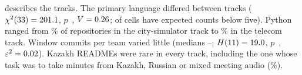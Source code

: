 \documentclass{article}
\begin{document}
 describes the tracks. The primary language differed between tracks ($\chi^2(\num{33}) = \num{201.1}$, $p$~\NRqThreeLanguageByTrackP, $V = \num{0.26}$; \NRqThreeLanguageByTrackCellsExpectedBelowFive{} of \NRqThreeLanguageByTrackCells{} cells have expected counts below five). Python ranged from \NRqThreeTracksTOneTwoPython\% of repositories in the city-simulator track to \NRqThreeTracksTZeroFourPython\% in the telecom track. Window commits per team varied little (medians \NRqThreeCommitsByTrackMedianMin--\NRqThreeCommitsByTrackMedianMax; $H(\num{11}) = \num{19.0}$, $p$~\NRqThreeCommitsByTrackP, $\varepsilon^2 = \num{0.02}$). Kazakh READMEs were rare in every track, including the one whose task was to take minutes from Kazakh, Russian or mixed meeting audio (\NRqThreeTracksTZeroEightKazakh\%).
\end{document}
